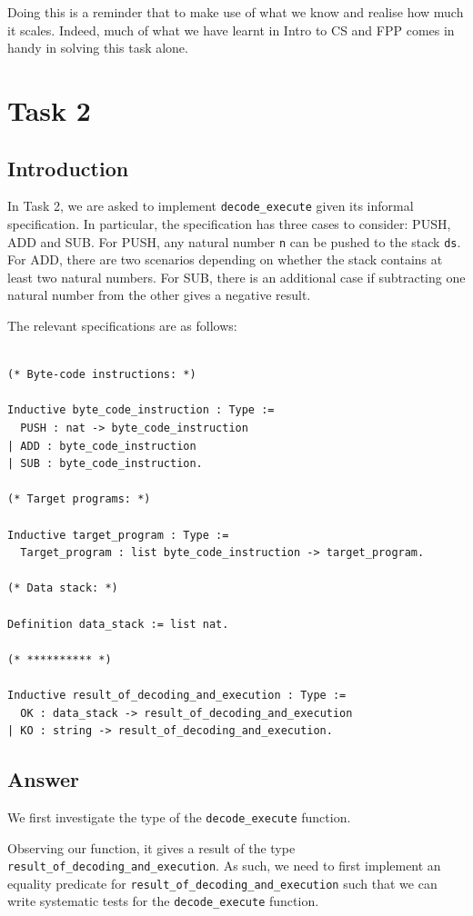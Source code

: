 \documentclass{article}
\begin{document}
Doing this is a reminder that to make use of what we know and realise how much it scales. Indeed, much of what we have learnt in Intro to CS and FPP comes in handy in solving this task alone. 

\section{Task 2}

\subsection{Introduction}
In Task 2, we are asked to implement \texttt{decode\_execute} given its informal specification. In particular, the specification has three cases to consider: PUSH, ADD and SUB. For PUSH, any natural number \texttt{n} can be pushed to the stack \texttt{ds}. For ADD, there are two scenarios depending on whether the stack contains at least two natural numbers. For SUB, there is an additional case if subtracting one natural number from the other gives a negative result.  

The relevant specifications are as follows:

\begin{lstlisting}

(* Byte-code instructions: *)

Inductive byte_code_instruction : Type :=
  PUSH : nat -> byte_code_instruction
| ADD : byte_code_instruction
| SUB : byte_code_instruction.

(* Target programs: *)

Inductive target_program : Type :=
  Target_program : list byte_code_instruction -> target_program.

(* Data stack: *)

Definition data_stack := list nat.

(* ********** *)

Inductive result_of_decoding_and_execution : Type :=
  OK : data_stack -> result_of_decoding_and_execution
| KO : string -> result_of_decoding_and_execution.

\end{lstlisting}
    
\subsection{Answer}
We first investigate the type of the \texttt{decode\_execute} function.

Observing our function, it gives a result of the type \texttt{result\_of\_decoding\_and\_execution}. As such, we need to first implement an equality predicate for \texttt{result\_of\_decoding\_and\_execution} such that we can write systematic tests for the \texttt{decode\_execute} function.
\end{document}
